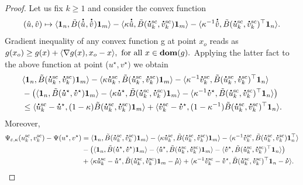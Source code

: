 \begin{proof}
Let us fix $k\geq 1$ and consider the convex function
\begin{equation*}
	(\hat u, \hat v) \mapsto \inr{\mathbf 1_n, \tilde{B}(\dt{\hat u}^{\text{}} ,\dt{\hat v}^{\text{}})\mathbf 1_m} - \inr{\kappa\dt{\hat u}, \tilde{B}(\dt{u}^{\text{sc}}_k ,\dt{v}^{\text{sc}}_k)\mathbf 1_m} - \inr{\kappa^{-1}\dt{\hat v}, \tilde{B}(\dt{u}^{\text{sc}}_k ,\dt{v}^{\text{sc}}_k)^\top\mathbf 1_n}.
\end{equation*}
Gradient inequality of any convex function g at point $x_o$ reads as $g(x_o) \geq g(x) + \langle \nabla g(x), x_o - x \rangle, \text{ for all } x \in \textbf{dom}(g).$
Applying the latter fact to the above function at point ($u^{\star}, v^{\star})$ we obtain
\begin{align*}
&\inr{\mathbf 1_n, \tilde{B}(\dt{u}^{\text{sc}}_k ,\dt{v}^{\text{sc}}_k)\mathbf 1_m} - \inr{\kappa\dt{u}^{\text{sc}}_k, \tilde{B}(\dt{u}^{\text{sc}}_k ,\dt{v}^{\text{sc}}_k)\mathbf 1_m} - \inr{\kappa^{-1}\dt{v}^{\text{sc}}_k, \tilde{B}(\dt{u}^{\text{sc}}_k ,\dt{v}^{\text{sc}}_k)^\top\mathbf 1_n}\\
& - \big(\inr{\mathbf 1_n, \tilde{B}(\dt{u}^{\star} ,\dt{v}^{\star})\mathbf 1_m}  
- \inr{\kappa\dt{u}^{\star{}}, \tilde{B}(\dt{u}^{\text{sc}}_k ,\dt{v}^{\text{sc}}_k)\mathbf 1_m} 
- \inr{\kappa^{-1}\dt{v}^\star, \tilde{B}(\dt{u}^{\text{sc}}_k ,\dt{v}^{\text{sc}}_k)^\top\mathbf 1_n} \big)\\
& \leq \inr{\dt{u}^{\text{sc}}_k - \dt{u}^\star, (1-\kappa) \tilde{B}(\dt{u}^{\text{sc}}_k ,\dt{v}^{\text{sc}}_k)\mathbf 1_m} 
+ \inr{\dt{v}^{\text{sc}}_k - \dt{v}^\star, (1-\kappa^{-1}) \tilde{B}(\dt{u}^{\text{sc}}_k ,\dt{v}^{\text{sc}}_k)^\top\mathbf 1_n}.
\end{align*}
Moreover,
\begin{align*}
\Psi_{\varepsilon, \kappa} (u^{\text{sc}}_k ,v^{\text{sc}}_k) -\Psi(u^\star, v^\star)
&= \inr{\mathbf 1_n, \tilde{B}(\dt{u}^{\text{sc}}_k ,\dt{v}^{\text{sc}}_k)\mathbf 1_m} - \inr{\kappa\dt{u}^{\text{sc}}_k, \tilde{B}(\dt{u}^{\text{sc}}_k ,\dt{v}^{\text{sc}}_k)\mathbf 1_m} - \inr{\kappa^{-1}\dt{v}_k^{\text{sc}}, \tilde{B}(\dt{u}_k^{\text{sc}}, \dt{v}^{\text{sc}}_k)\mathbf 1_n^\top}\\
& - \big( 
\inr{\mathbf 1_n, \tilde{B}(\dt{u}^{\star} ,\dt{v}^{\star})\mathbf 1_m}  
- \inr{\dt{u}^{\star{}}, \tilde{B}(\dt{u}^{\text{sc}}_k ,\dt{v}^{\text{sc}}_k)\mathbf 1_m} 
- \inr{\dt{v}^\star, \tilde{B}(\dt{u}^{\text{sc}}_k ,\dt{v}^{\text{sc}}_k)^\top\mathbf 1_n} \big)\\
&+ \inr{\kappa \dt{u}^{\text{sc}}_k - \dt{u}^{\star}, \tilde{B}(\dt{u}^{\text{sc}}_k ,\dt{v}^{\text{sc}}_k)\mathbf 1_m - \dt{\mu}} + \inr{\kappa^{-1}\dt{v}^{\text{sc}}_k - \dt{v}^{\star}, \tilde{B}(\dt{u}^{\text{sc}}_k ,\dt{v}^{\text{sc}}_k)^\top\mathbf 1_n - \dt{\nu}}.

\end{align*}
\end{proof}
